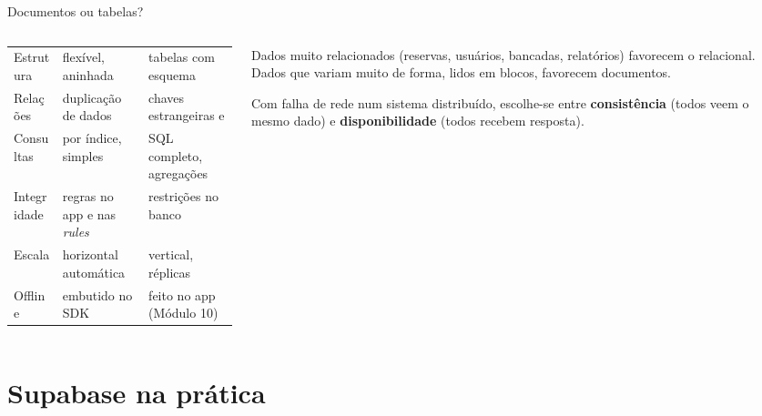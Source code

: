 \documentclass[aspectratio=169,10pt]{beamer}
\begin{document}
\begin{frame}{Documentos ou tabelas?}
  \begin{columns}[T]
    \begin{column}{0.5\textwidth}
      \scriptsize
      \begin{tabularx}{\linewidth}{@{}l L L@{}}
        \toprule
        &  &  \\
        \midrule
        Estrutura & flexível, aninhada & tabelas com esquema \\
        Relações & duplicação de dados & chaves estrangeiras e  \\
        Consultas & por índice, simples & SQL completo, agregações \\
        Integridade & regras no app e nas \emph{rules} & restrições no banco \\
        Escala & horizontal automática & vertical, réplicas \\
        Offline & embutido no SDK & feito no app (Módulo 10) \\
        \bottomrule
      \end{tabularx}
    \end{column}
    \begin{column}{0.48\textwidth}
      \begin{conceito}
        Dados muito relacionados (reservas, usuários, bancadas, relatórios) favorecem o relacional. Dados que variam muito de forma, lidos em blocos, favorecem documentos.
      \end{conceito}
      \begin{dica}
        Com falha de rede num sistema distribuído, escolhe-se entre \textbf{consistência} (todos veem o mesmo dado) e \textbf{disponibilidade} (todos recebem resposta).
      \end{dica}
    \end{column}
  \end{columns}
\end{frame}

\section{Supabase na prática}
\end{document}
